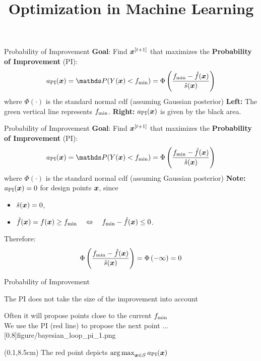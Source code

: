 \documentclass[11pt,compress,t,notes=noshow, xcolor=table]{beamer}
\title{Optimization in Machine Learning}
\begin{document}

\begin{framev}{Probability of Improvement}
\textbf{Goal}: Find $\bm{x}^{[t+1]}$ that maximizes the \textbf{Probability of Improvement} (PI):
$$
a_{\text{PI}}(\xv) = \P(Y(\xv) < \fmin) = \Phi\left(\frac{\fmin - \fh(\xv)}{\sh(\xv)}\right)
$$
where $\Phi(\cdot)$ is the standard normal cdf (assuming Gaussian posterior)
\vfill
{}
\spacer
\footnotesize
\textbf{Left:} The green vertical line represents $f_{\min}$.
\textbf{Right:} $a_{\text{PI}}(\bm{x})$ is given by the black area.
\end{framev}


\begin{framev}{Probability of Improvement}
\textbf{Goal}: Find $\bm{x}^{[t+1]}$ that maximizes the \textbf{Probability of Improvement} (PI):
$$
a_{\text{PI}}(\xv) = \P(Y(\xv) < \fmin) = \Phi\left(\frac{\fmin - \fh(\xv)}{\sh(\xv)}\right)
$$
where $\Phi(\cdot)$ is the standard normal cdf (assuming Gaussian posterior)
\vfill
\textbf{Note:} $a_\text{PI}(\bm{x})=0$ for design points $\bm{x}$, since
\begin{itemize}
\item $\hat{s}(\bm{x}) = 0$,
\item $\hat{f}(\bm{x}) = f(\bm{x}) \ge f_{\min} \quad \Leftrightarrow \quad f_{\min} - \hat{f}(\bm{x}) \le 0$.
\end{itemize}
Therefore:
$$
\Phi\left(\frac{f_{\min} - \hat{f}(\bm{x})}{\hat{s}(\bm{x})}\right) = \Phi\left(- \infty\right) = 0
$$
\end{framev}


\begin{framei}[align=top]{Probability of Improvement}
\item The PI does not take the size of the improvement into account
\item Often it will propose points close to the current $f_{\min}$\\
\spacer
We use the PI (red line) to propose the next point ...
\imageFixed{2.5cm}{2.9cm}[0.8]{figure/bayesian_loop_pi_1.png}
\begin{textblock*}{\linewidth}(0.1\linewidth,8.5cm)
\centering The red point depicts $\mathop{\mathrm{arg\,max}}_{\bm{x} \in \mathcal{S}} a_{\text{PI}}(\bm{x})$
\end{textblock*}
\end{framei}
\end{document}
